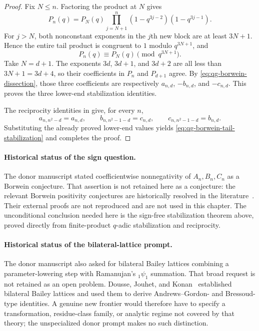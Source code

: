 \begin{proof}
Fix \(N\le n\).  Factoring the product at \(N\) gives
\[
 P_n(q)=P_N(q)
 \prod_{j=N+1}^{n}(1-q^{3j-2})(1-q^{3j-1}).
\]
For \(j>N\), both nonconstant exponents in the \(j\)th new block are at least
\(3N+1\).  Hence the entire tail product is congruent to \(1\) modulo
\(q^{3N+1}\), and
\begin{equation}
 P_n(q)\equiv P_N(q)\pmod{q^{3N+1}}.
\label{eq:qg-borwein-finite-product-stabilization}
\end{equation}
Take \(N=d+1\).  The exponents \(3d\), \(3d+1\), and \(3d+2\) are all less
than \(3N+1=3d+4\), so their coefficients in \(P_n\) and \(P_{d+1}\) agree.
By \eqref{eq:qg-borwein-dissection}, those three coefficients are respectively
\(a_{n,d}\), \(-b_{n,d}\), and \(-c_{n,d}\).  This proves the three lower-end
stabilization identities.

The reciprocity identities in  give, for
every \(n\),
\[
 a_{n,n^2-d}=a_{n,d},
 \qquad
 b_{n,n^2-1-d}=c_{n,d},
 \qquad
 c_{n,n^2-1-d}=b_{n,d}.
\]
Substituting the already proved lower-end values yields
\eqref{eq:qg-borwein-tail-stabilization} and completes the proof.
\end{proof}

\paragraph{Historical status of the sign question.}
\label{qg:hist-borwein-sign-status}
The donor manuscript stated coefficientwise nonnegativity of
\(A_n,B_n,C_n\) as a Borwein conjecture.  That assertion is not retained here
as a conjecture: the relevant Borwein positivity conjectures are historically
resolved in the literature~\cite{Wang2022,WangKrattenthaler2022}.  Their
external proofs are not reproduced and are not used in this chapter.  The
unconditional conclusion needed here is the sign-free stabilization theorem
above, proved directly from finite-product \(q\)-adic stabilization and
reciprocity.

\paragraph{Historical status of the bilateral-lattice prompt.}
\label{qg:hist-bilateral-bailey-lattices}
The donor manuscript also asked for bilateral Bailey lattices combining a
parameter-lowering step with Ramanujan's \({}_1\psi_1\) summation.  That broad
request is not retained as an open problem.  Dousse, Jouhet, and
Konan~\cite{DousseJouhetKonan2025} established bilateral Bailey lattices and
used them to derive Andrews--Gordon- and Bressoud-type identities.  A genuine
new frontier would therefore have to specify a transformation, residue-class
family, or analytic regime not covered by that theory; the unspecialized donor
prompt makes no such distinction.

